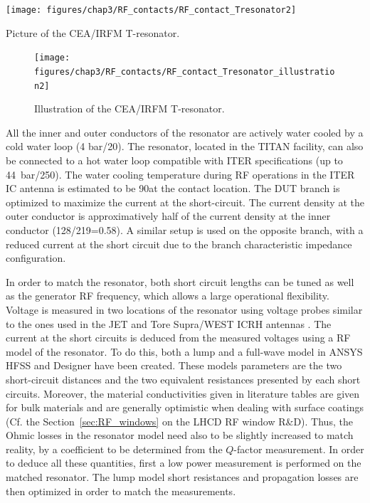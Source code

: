 {\begin{marginfigure}
	\centering
	\texttt{[image: figures/chap3/RF\_contacts/RF\_contact\_Tresonator2]}
	\caption{Picture of the CEA/IRFM T-resonator.}
	\label{fig:rfcontacttresonator2}
\end{marginfigure}

\begin{figure}
	\centering
	\texttt{[image: figures/chap3/RF\_contacts/RF\_contact\_Tresonator\_illustration2]}
	\caption{Illustration of the CEA/IRFM T-resonator.}
	\label{fig:rfcontacttresonatorillustration2}
\end{figure}

All the inner and outer conductors of the resonator are actively water cooled by a cold water loop (4 bar/20\degC). The resonator, located in the TITAN facility, can also be connected to a hot water loop compatible with ITER specifications (up to 44~bar/250\degC). The water cooling temperature during RF operations in the ITER IC antenna is estimated to be 90\degC at the contact location. The DUT branch is optimized to maximize the current at the short-circuit. The current density at the outer conductor is approximatively half of the current density at the inner conductor (128/219=0.58). A similar setup is used on the opposite branch, with a reduced current at the short circuit due to the branch characteristic impedance configuration.

In order to match the resonator, both short circuit lengths can be tuned as well as the generator RF frequency, which allows a large operational flexibility. Voltage is measured in two locations of the resonator using voltage probes similar to the ones used in the JET and Tore Supra/WEST ICRH antennas . The current at the short circuits is deduced from the measured voltages using a RF model of the resonator. To do this, both a lump and a full-wave model in ANSYS HFSS and Designer have been created. These models parameters are the two short-circuit distances and the two equivalent resistances presented by each short circuits. Moreover, the material conductivities given in literature tables are given for bulk materials and are generally optimistic when dealing with surface coatings (Cf. the Section~\ref{sec:RF_windows} on the LHCD RF window R\&D). Thus, the Ohmic losses in the resonator model need also to be slightly increased to match reality, by a coefficient to be determined from the $Q$-factor measurement. In order to deduce all these quantities, first a low power measurement is performed on the matched resonator. The lump model short resistances and propagation losses are then optimized in order to match the measurements. 

}
